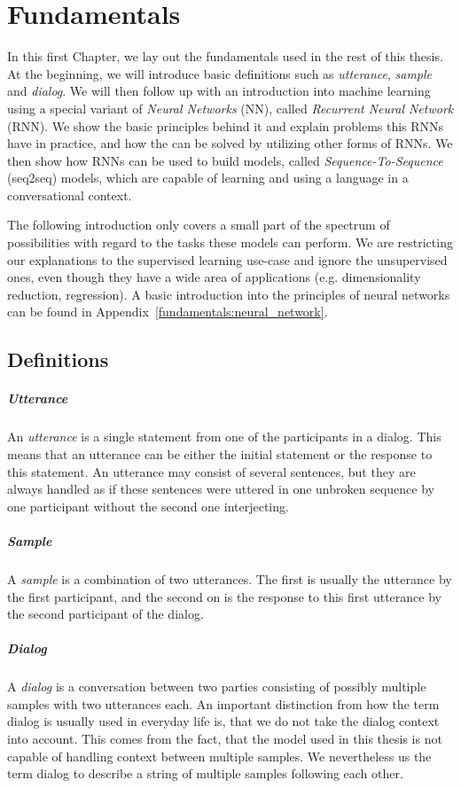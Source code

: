 \chapter{Fundamentals}
\label{chapter:fundamental}
In this first Chapter, we lay out the fundamentals used in the rest of this thesis. At the beginning, we will introduce basic definitions such as \emph{utterance}, \emph{sample} and \emph{dialog}. We will then follow up with an introduction into machine learning using a special variant of \emph{Neural Networks} (NN), called \emph{Recurrent Neural Network} (RNN). We show the basic principles behind it and explain problems this RNNs have in practice, and how the can be solved by utilizing other forms of RNNs. We then show how RNNs can be used to build models, called \emph{Sequence-To-Sequence} (seq2seq) models, which are capable of learning and using a language in a conversational context.

The following introduction only covers a small part of the spectrum of possibilities with regard to the tasks these models can perform. We are restricting our explanations to the supervised learning use-case and ignore the unsupervised ones, even though they have a wide area of applications (e.g. dimensionality reduction, regression). A basic introduction into the principles of neural networks can be found in Appendix~\ref{fundamentals:neural_network}.

\section{Definitions}
\paragraph{Utterance} An \emph{utterance} is a single statement from one of the participants in a dialog. This means that an utterance can be either the initial statement or the response to this statement. An utterance may consist of several sentences, but they are always handled as if these sentences were uttered in one unbroken sequence by one participant without the second one interjecting.
\paragraph{Sample} A \emph{sample} is a combination of two utterances. The first is usually the utterance by the first participant, and the second on is the response to this first utterance by the second participant of the dialog.
\paragraph{Dialog} A \emph{dialog} is a conversation between two parties consisting of possibly multiple samples with two utterances each. An important distinction from how the term dialog is usually used in everyday life is, that we do not take the dialog context into account. This comes from the fact, that the model used in this thesis is not capable of handling context between multiple samples. We nevertheless us the term dialog to describe a string of multiple samples following each other.

